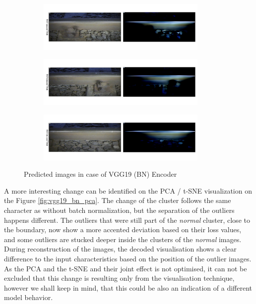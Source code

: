 \begin{figure}[!ht]
    \centering
    \begin{subfigure}{\textwidth}
        \centering
        \includegraphics[width=0.9\textwidth,trim={0 1cm 0 1cm},clip]{./results/vgg19_bn_vgg19/20230525_045131_predict_0.png}
    \end{subfigure}
    \begin{subfigure}{\textwidth}
        \centering
        \includegraphics[width=0.9\textwidth,trim={0 1cm 0 1cm},clip]{./results/vgg19_bn_vgg19/20230525_045131_predict_1.png}
    \end{subfigure}
    \begin{subfigure}{\textwidth}
        \centering
        \includegraphics[width=0.9\textwidth,trim={0 1cm 0 1cm},clip]{./results/vgg19_bn_vgg19/20230525_045131_predict_2.png}
    \end{subfigure}
    \caption{Predicted images in case of VGG19 (BN) Encoder}
    \label{fig:vgg19_bn_examples}
\end{figure}

A more interesting change can be identified on the PCA / t-SNE visualization on the
Figure \ref{fig:vgg19_bn_pca}.
The change of the cluster follows the same character as without batch normalization, but the separation
of the outliers happens different.
The outliers that were still part of the \emph{normal} cluster, close to the boundary, now show a more
accented deviation based on their loss values, and some outliers are stucked deeper inside the clusters
of the \emph{normal} images.
During reconstruction of the images, the decoded visualisation shows a clear difference to the input
characteristics based on the position of the outlier images.
As the PCA and the t-SNE and their joint effect is not optimised, it can not be excluded that this change
is resulting only from the visualisation technique, however we shall keep in mind, that this could be
also an indication of a different model behavior.

